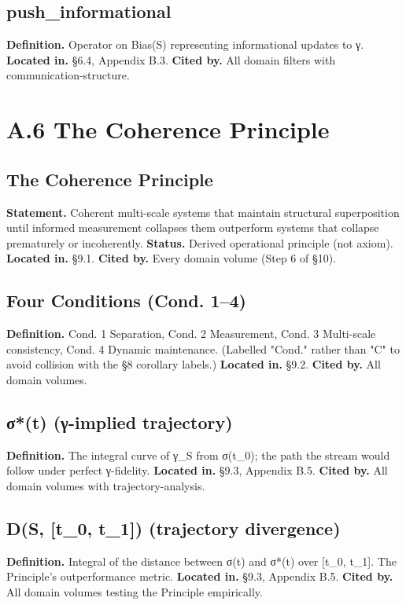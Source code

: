 \documentclass[11pt, openany]{book}
\newcommand{\sectionbreak}{\clearpage}
\begin{document}
\subsection{push\_\allowbreak{}informational}
\textbf{Definition.} Operator on Bias(S) representing informational updates to γ.
\textbf{Located in.} §6.4, Appendix B.3.
\textbf{Cited by.} All domain filters with communication-structure.

\sectionbreak

\section{A.6 The Coherence Principle}

\subsection{The Coherence Principle}
\textbf{Statement.} Coherent multi-scale systems that maintain structural superposition until informed measurement collapses them outperform systems that collapse prematurely or incoherently.
\textbf{Status.} Derived operational principle (not axiom).
\textbf{Located in.} §9.1.
\textbf{Cited by.} Every domain volume (Step 6 of §10).

\subsection{Four Conditions (Cond. 1–4)}
\textbf{Definition.} Cond. 1 Separation, Cond. 2 Measurement, Cond. 3 Multi-scale consistency, Cond. 4 Dynamic maintenance. (Labelled "Cond." rather than "C" to avoid collision with the §8 corollary labels.)
\textbf{Located in.} §9.2.
\textbf{Cited by.} All domain volumes.

\subsection{σ*(t) (γ-implied trajectory)}
\textbf{Definition.} The integral curve of γ\_\allowbreak{}S from σ(t\_\allowbreak{}0); the path the stream would follow under perfect γ-fidelity.
\textbf{Located in.} §9.3, Appendix B.5.
\textbf{Cited by.} All domain volumes with trajectory-analysis.

\subsection{D(S, [t\_\allowbreak{}0, t\_\allowbreak{}1]) (trajectory divergence)}
\textbf{Definition.} Integral of the distance between σ(t) and σ*(t) over [t\_\allowbreak{}0, t\_\allowbreak{}1]. The Principle's outperformance metric.
\textbf{Located in.} §9.3, Appendix B.5.
\textbf{Cited by.} All domain volumes testing the Principle empirically.
\end{document}
